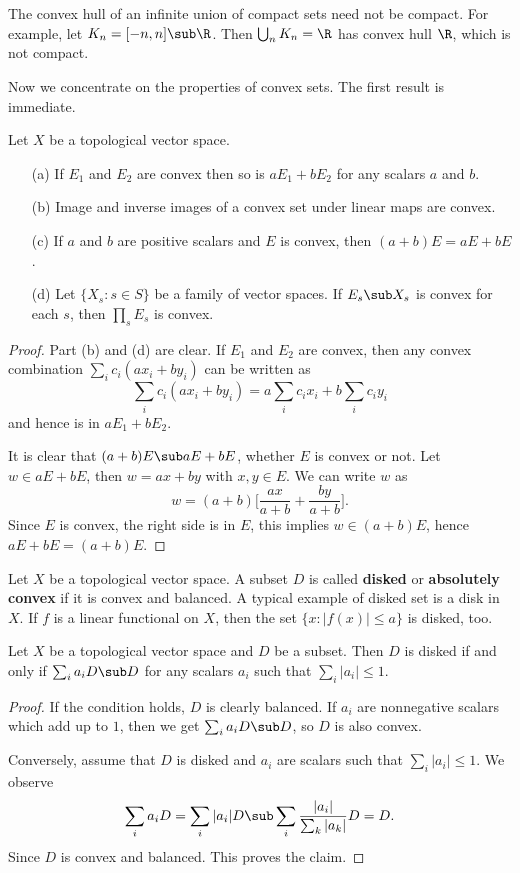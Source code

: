 \begin{example}
The convex hull of an infinite union of compact sets need not be compact. For example, let $K_n=[-n,n]\sub\R$. Then $\bigcup_nK_n=\R$ has convex hull $\R$, which is not compact.
\end{example}
Now we concentrate on the properties of convex sets. The first result is immediate.
\begin{proposition}\label{TVS convex set prop}
Let $X$ be a topological vector space.
\begin{itemize}
\item[(a)] If $E_1$ and $E_2$ are convex then so is $aE_1+bE_2$ for any scalars $a$ and $b$.
\item[(b)] Image and inverse images of a convex set under linear maps are convex.
\item[(c)] If $a$ and $b$ are positive scalars and $E$ is convex, then $(a+b)E=aE+bE$.
\item[(d)] Let $\{X_s:s\in S\}$ be a family of vector spaces. If $E_s\sub X_s$ is convex for each $s$, then $\prod_sE_s$ is convex. 
\end{itemize}
\end{proposition}
\begin{proof}
Part (b) and (d) are clear. If $E_1$ and $E_2$ are convex, then any convex combination $\sum_ic_i(ax_i+by_i)$ can be written as
\[\sum_ic_i(ax_i+by_i)=a\sum_ic_ix_i+b\sum_ic_iy_i\]
and hence is in $aE_1+bE_2$.\par
It is clear that $(a+b)E\sub aE+bE$, whether $E$ is convex or not. Let $w\in aE+bE$, then $w=ax+by$ with $x,y\in E$. We can write $w$ as
\[w=(a+b)\Big[\frac{ax}{a+b}+\frac{by}{a+b}\Big].\]
Since $E$ is convex, the right side is in $E$, this implies $w\in(a+b)E$, hence $aE+bE=(a+b)E$.
\end{proof}
Let $X$ be a topological vector space. A subset $D$ is called \textbf{disked} or \textbf{absolutely convex} if it is convex and balanced. A typical example of disked set is a disk in $X$. If $f$ is a linear functional on $X$, then the set $\{x:|f(x)|\leq a\}$ is disked, too.
\begin{proposition}\label{TVS disked set char}
Let $X$ be a topological vector space and $D$ be a subset. Then $D$ is disked if and only if $\sum_ia_iD\sub D$ for any scalars $a_i$ such that $\sum_i|a_i|\leq 1$.
\end{proposition}
\begin{proof}
If the condition holds, $D$ is clearly balanced. If $a_i$ are nonnegative scalars which add up to $1$, then we get $\sum_ia_iD\sub D$, so $D$ is also convex.\par
Conversely, assume that $D$ is disked and $a_i$ are scalars such that $\sum_i|a_i|\leq 1$. We observe
\[\sum_ia_iD=\sum_i|a_i|D\sub\sum_i\frac{|a_i|}{\sum_k|a_k|}D=D.\]
Since $D$ is convex and balanced. This proves the claim.
\end{proof}
